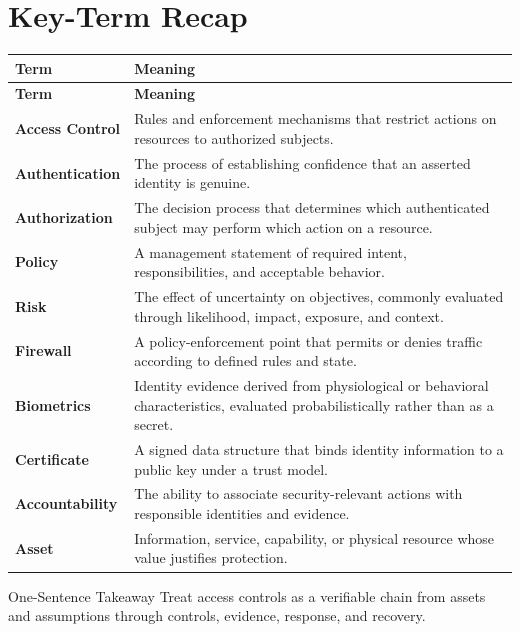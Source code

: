 \documentclass[11pt,letterpaper]{article}
\begin{document}
\section*{Key-Term Recap}
\begin{longtable}{>{\raggedright\arraybackslash}p{}>{\raggedright\arraybackslash}p{}}
\toprule\rowcolor{Navy}\color{white}\textbf{Term} & \color{white}\textbf{Meaning}\\\midrule
\endfirsthead
\toprule\rowcolor{Navy}\color{white}\textbf{Term} & \color{white}\textbf{Meaning}\\\midrule
\endhead
\textbf{Access Control} & Rules and enforcement mechanisms that restrict actions on resources to authorized subjects. \\\midrule
\textbf{Authentication} & The process of establishing confidence that an asserted identity is genuine. \\\midrule
\textbf{Authorization} & The decision process that determines which authenticated subject may perform which action on a resource. \\\midrule
\textbf{Policy} & A management statement of required intent, responsibilities, and acceptable behavior. \\\midrule
\textbf{Risk} & The effect of uncertainty on objectives, commonly evaluated through likelihood, impact, exposure, and context. \\\midrule
\textbf{Firewall} & A policy-enforcement point that permits or denies traffic according to defined rules and state. \\\midrule
\textbf{Biometrics} & Identity evidence derived from physiological or behavioral characteristics, evaluated probabilistically rather than as a secret. \\\midrule
\textbf{Certificate} & A signed data structure that binds identity information to a public key under a trust model. \\\midrule
\textbf{Accountability} & The ability to associate security-relevant actions with responsible identities and evidence. \\\midrule
\textbf{Asset} & Information, service, capability, or physical resource whose value justifies protection. \\\midrule
\bottomrule
\end{longtable}
\begin{CornellExamBox}{One-Sentence Takeaway}
Treat access controls as a verifiable chain from assets and assumptions through controls, evidence, response, and recovery.
\end{CornellExamBox}
\end{document}

